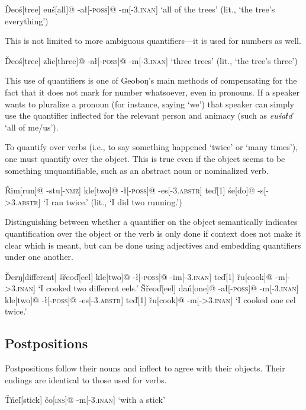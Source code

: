 \documentclass[10pt]{article}
\newcommand{\sk}{\textsc}
\newcommand{\vd}{ď}
\newcommand{\vc}{č}
\newcommand{\vs}{š}
\newcommand{\vr}{ř}
\newcommand{\vl}{ľ}
\newcommand{\vT}{Ť}
\newcommand{\vD}{Ď}
\newcommand{\vS}{Š}
\newcommand{\vR}{Ř}
\newcommand{\dbl}{ⱡ}
\newcommand{\engma}{ŋ}
\begin{document}
\ex
\begingl
\vD eo\'s[tree]
eu\'s[all]@
-a\l[-\sk{poss}]@
-m[-\sk{3.inan}]
\glft `all of the trees' (lit., `the tree's everything')
\endgl
\xe

This is not limited to more ambiguous quantifiers---it is used for numbers as well.

\ex
\begingl
\vD eo\'s[tree]
zlic[three]@
-a\l[-\sk{poss}]@
-m[-\sk{3.inan}]
\glft `three trees' (lit., `the tree's three')
\endgl
\xe

This use of quantifiers is one of Geobo{\engma}'s main methods of compensating for the fact that it does not mark for number whatsoever, even in pronouns. If a speaker wants to pluralize a pronoun (for instance, saying `we') that speaker can simply use the quantifier inflected for the relevant person and animacy (such as \textit{eu\'sa\dbl\vd} `all of me/us').

To quantify over verbs (i.e., to say something happened `twice' or `many times'), one must quantify over the object. This is true even if the object seems to be something unquantifiable, such as an abstract noun or nominalized verb.

\ex
\begingl
\vR im[run]@
-stu[-\sk{nmz}]
kle[two]@
-\l[-\sk{poss}]@
-es[-\sk{3.abstr}]
te{\vd}[1]
\'se[do]@
-s[-\sk{>3.abstr}]
\glft `I ran twice.' (lit., `I did two running.')
\endgl
\xe

Distinguishing between whether a quantifier on the object semantically indicates quantification over the object or the verb is only done if context does not make it clear which is meant, but can be done using adjectives and embedding quantifiers under one another.

\pex
\a
\begingl
\vD er\engma[different]
\vs\vr eo\vd[eel]
kle[two]@
-\l[-\sk{poss}]@
-im[-\sk{3.inan}]
te\vd[1]
\vr u[cook]@
-m[-\sk{>3.inan}]
\glft `I cooked two different eels.'
\endgl
\a
\begingl
\vS\vr eo\vd[eel]
da\'n[one]@
-a\l[-\sk{poss}]@
-m[-\sk{3.inan}]
kle[two]@
-\l[-\sk{poss}]@
-es[-\sk{3.abstr}]
te\vd[1]
\vr u[cook]@
-m[\sk{->3.inan}]
\glft `I cooked one eel twice.'
\endgl
\xe

\subsection{Postpositions}

Postpositions follow their nouns and inflect to agree with their objects. Their endings are identical to those used for verbs.

\ex
\begingl
\vT\'ne{\vl}[stick]
\vc o[\sk{ins}]@
-m[-\sk{3.inan}]
\glft `with a stick'
\endgl
\xe
\end{document}
